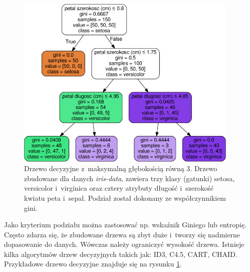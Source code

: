 \begin{figure}[H]
	\centering
	\includegraphics[width=0.95\textwidth]{./images/drzewo.jpg}
	\caption[Rysunek przykładowego drzewa decyzyjnego]{Drzewo decyzyjne z~maksymalną głębokością równą 3. Drzewo zbudowane dla danych \textit{iris-data}, zawiera trzy klasy (gatunki) setosa, versicolor i~virginica oraz cztery atrybuty długość i~szerokość kwiatu peta i~sepal. Podział został dokonany ze współczynnikiem gini.}
	\label{fig:drzewodec}
\end{figure}
Jako kryterium podziału można zastosować np. wskaźnik Giniego lub entropię. Często zdarza się, że zbudowane drzewa są zbyt duże i~tworzy się nadmierne dopasowanie do danych. Wówczas należy ograniczyć wysokość drzewa.
Istnieje kilka algorytmów drzew decyzyjnych takich jak: ID3, C4.5, CART, CHAID. Przykładowe drzewo decyzyjne znajduje się na rysunku \ref{fig:drzewodec}.
\newpage
